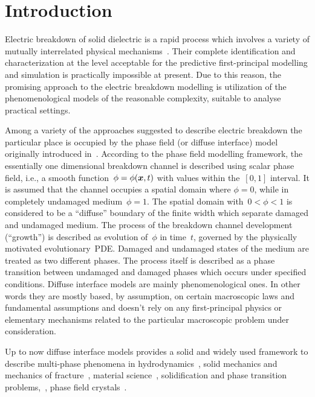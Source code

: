 
\section{Introduction}

Electric breakdown of solid dielectric is a rapid process which
involves a variety of mutually interrelated physical
mechanisms~\cite{vorobiev_dielectric_physics, dissado_1992}. Their
complete identification and characterization at the level acceptable
for the predictive first-principal modelling and simulation is
practically impossible at present. Due to this reason, the promising
approach to the electric breakdown modelling is utilization of the
phenomenological models of the reasonable complexity, suitable to
analyse practical settings.

Among a variety of the approaches suggested to describe electric breakdown the particular place is occupied by
the phase field (or diffuse interface) model originally introduced in~\cite{pitike_dielectric_breakdown}.
According to the phase field modelling framework, the essentially one dimensional
breakdown channel is described using scalar phase field, i.e., a
smooth
function~$\phi = \phi(\boldsymbol{x},t)$ with values within the~$[0, 1]$
interval.
It is assumed that the channel occupies
a spatial domain where $\phi = 0$, while in completely undamaged medium~$\phi = 1$. The
spatial domain with~$0 < \phi < 1$ is considered to be a ``diffuse'' boundary of the finite
width which separate damaged and undamaged medium. The process of the breakdown
channel development (``growth'') is described as evolution of~$\phi$ in time~$t$, governed by
the physically motivated evolutionary~PDE. Damaged and undamaged states of the
medium are treated as two different phases. The process itself is described as a phase
transition between undamaged and damaged phases which occurs under specified
conditions.
Diffuse interface models are mainly phenomenological ones. In other
words they are mostly based, by assumption, on certain macroscopic laws and
fundamental assumptions and doesn't rely on any first-principal
physics or elementary mechanisms related to the
particular macroscopic problem under consideration.

Up to now diffuse interface models provides a solid and widely used
framework to describe multi-phase phenomena in
hydrodynamics~\cite{lamorgese_flow_modeling, kim_fluid_flows, xu_hydrodynamics},
solid mechanics and mechanics of fracture~\cite{ambati_fracture},
material science~\cite{provatas_materials}, solidification and phase
transition problems,~\cite{boettinger_solidification,
  cartalade_phase_separation, gransaly_solidification},
phase field crystals~\cite{emmerich_crystal, asadi_crystal,
  provatas_crystal}.


